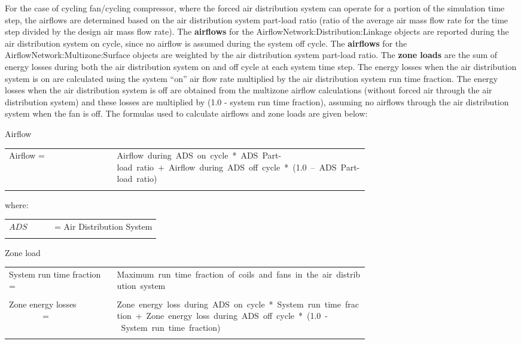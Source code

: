 For the case of cycling fan/cycling compressor, where the forced air distribution system can operate for a portion of the simulation time step, the airflows are determined based on the air distribution system part-load ratio (ratio of the average air mass flow rate for the time step divided by the design air mass flow rate). The \textbf{airflows} for the AirflowNetwork:Distribution:Linkage objects are reported during the air distribution system on cycle, since no airflow is assumed during the system off cycle. The \textbf{airflows} for the AirflowNetwork:Multizone:Surface objects are weighted by the air distribution system part-load ratio. The \textbf{zone loads} are the sum of energy losses during both the air distribution system on and off cycle at each system time step. The energy losses when the air distribution system is on are calculated using the system ``on'' air flow rate multiplied by the air distribution system run time fraction. The energy losses when the air distribution system is off are obtained from the multizone airflow calculations (without forced air through the air distribution system) and these losses are multiplied by (1.0 - system run time fraction), assuming no airflows through the air distribution system when the fan is off. The formulas used to calculate airflows and zone loads are given below:

Airflow

\begin{tabular}{lp{0.7\linewidth}}
\\
Airflow = &Airflow~during~ADS~on~cycle~*~ADS~Part-load~ratio~+~Airflow~during~ADS~off~cycle~*~(1.0~--~ADS~Part-load~ratio)\\
\\
\end{tabular}

where:

\begin{tabular}{lp{0.7\linewidth}}
\\
$ADS$ &= Air Distribution System\\
\\
\end{tabular}

Zone load

\begin{tabular}{lp{0.7\linewidth}}
\\
System run time fraction = &Maximum~run~time~fraction~of~coils~and~fans~in~the~air~distribution~system\\
\\
Zone energy losses ~~~~~~~~= &Zone~energy~loss~during~ADS~on~cycle~*~System~run~time~fraction~+~Zone~energy~loss~during~ADS~off~cycle~*~(1.0~-~System~run~time~fraction)\\
\\
\end{tabular}

